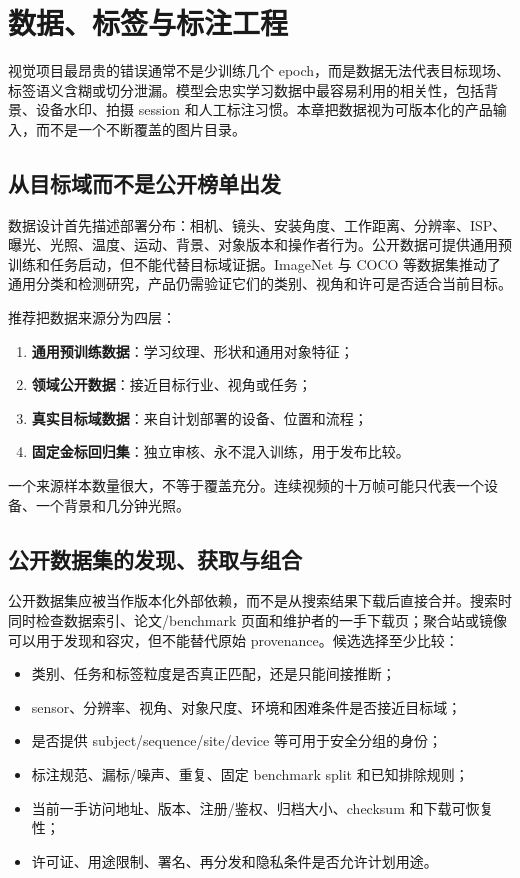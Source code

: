 \chapter{数据、标签与标注工程}
\label{chap:edge-ai-data-label-engineering}

视觉项目最昂贵的错误通常不是少训练几个 epoch，而是数据无法代表目标现场、标签语义含糊或切分泄漏。模型会忠实学习数据中最容易利用的相关性，包括背景、设备水印、拍摄 session 和人工标注习惯。本章把数据视为可版本化的产品输入，而不是一个不断覆盖的图片目录。

\section{从目标域而不是公开榜单出发}

数据设计首先描述部署分布：相机、镜头、安装角度、工作距离、分辨率、ISP、曝光、光照、温度、运动、背景、对象版本和操作者行为。公开数据可提供通用预训练和任务启动，但不能代替目标域证据。ImageNet 与 COCO 等数据集推动了通用分类和检测研究\cite{imagenet,coco}，产品仍需验证它们的类别、视角和许可是否适合当前目标。

推荐把数据来源分为四层：

\begin{enumerate}
  \item \textbf{通用预训练数据}：学习纹理、形状和通用对象特征；
  \item \textbf{领域公开数据}：接近目标行业、视角或任务；
  \item \textbf{真实目标域数据}：来自计划部署的设备、位置和流程；
  \item \textbf{固定金标回归集}：独立审核、永不混入训练，用于发布比较。
\end{enumerate}

一个来源样本数量很大，不等于覆盖充分。连续视频的十万帧可能只代表一个设备、一个背景和几分钟光照。

\section{公开数据集的发现、获取与组合}

公开数据集应被当作版本化外部依赖，而不是从搜索结果下载后直接合并。搜索时同时检查数据索引、论文/benchmark 页面和维护者的一手下载页；聚合站或镜像可以用于发现和容灾，但不能替代原始 provenance。候选选择至少比较：

\begin{itemize}
  \item 类别、任务和标签粒度是否真正匹配，还是只能间接推断；
  \item sensor、分辨率、视角、对象尺度、环境和困难条件是否接近目标域；
  \item 是否提供 subject/sequence/site/device 等可用于安全分组的身份；
  \item 标注规范、漏标/噪声、重复、固定 benchmark split 和已知排除规则；
  \item 当前一手访问地址、版本、注册/鉴权、归档大小、checksum 和下载可恢复性；
  \item 许可证、用途限制、署名、再分发和隐私条件是否允许计划用途。
\end{itemize}

